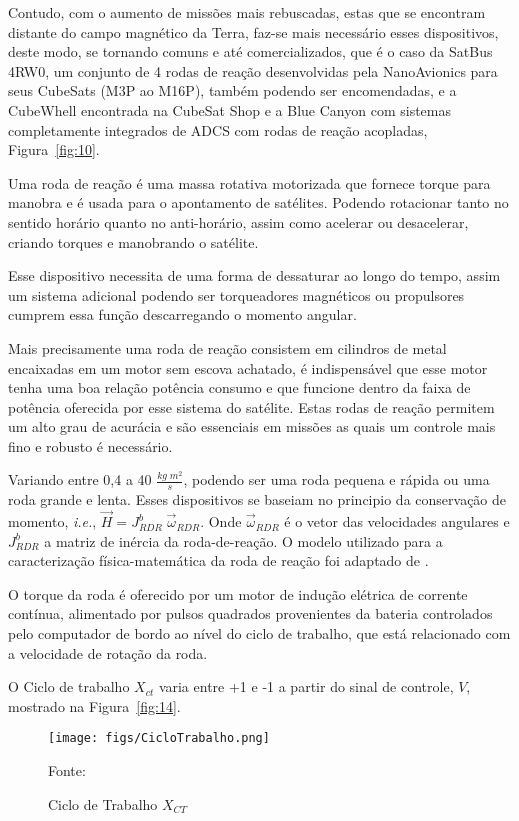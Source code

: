 Contudo, com o aumento de missões mais rebuscadas, estas que se encontram distante do campo magnético da Terra, faz-se mais necessário esses dispositivos, deste modo, se tornando comuns e até comercializados, que é o caso da SatBus 4RW0, um conjunto de 4 rodas de reação desenvolvidas pela NanoAvionics para seus CubeSats (M3P ao M16P),  também podendo ser encomendadas, e a CubeWhell encontrada na CubeSat Shop e a Blue Canyon com sistemas completamente integrados de ADCS com rodas de reação acopladas,  Figura~\ref{fig:10}.


Uma roda de reação é uma massa rotativa motorizada que fornece torque para manobra e é usada para o apontamento de satélites. Podendo rotacionar tanto no sentido horário quanto no anti-horário, assim como acelerar ou desacelerar, criando torques e manobrando o satélite.

Esse dispositivo necessita de uma forma de dessaturar ao longo do tempo, assim um sistema adicional podendo ser torqueadores magnéticos ou propulsores cumprem essa função descarregando o momento angular.

Mais precisamente uma roda de reação consistem em cilindros de metal encaixadas em um motor sem escova achatado, é indispensável que esse motor tenha uma boa relação potência consumo e que funcione dentro da faixa de potência oferecida por esse sistema do satélite. Estas rodas de reação permitem um alto grau de acurácia e são essenciais em missões as quais um controle mais fino e robusto é necessário.

Variando entre 0,4 a 40 $\frac{kg\;m^2}{s}$, podendo ser uma roda pequena e rápida ou uma roda grande e lenta. Esses dispositivos se baseiam no principio da conservação de momento, \textit{i.e.}, $\vec{H}=J^b_{RDR}\;\vec{\omega}_{RDR}$. Onde $\vec{\omega}_{RDR}$ é o vetor das velocidades angulares e $J^b_{RDR}$ a matriz de inércia da roda-de-reação. O modelo utilizado para a caracterização física-matemática da roda de reação foi adaptado de \cite[p.~270-271]{wertz2012spacecraft}.

O torque da roda é oferecido por um motor de indução elétrica de corrente contínua, alimentado por pulsos quadrados provenientes da bateria controlados pelo computador de bordo ao nível do ciclo de trabalho, que está relacionado com a velocidade de rotação da roda.

O Ciclo de trabalho $X_{ct}$ varia entre +1 e -1 a partir do sinal de controle, $V$, mostrado na Figura~\ref{fig:14}.

\begin{figure}[htpb]
\centering
\texttt{[image: figs/CicloTrabalho.png]}
\caption{Ciclo de Trabalho $X_{CT}$}
{Fonte: \cite[p.~271]{wertz2012spacecraft}}
\label{fig:4}
\end{figure}


